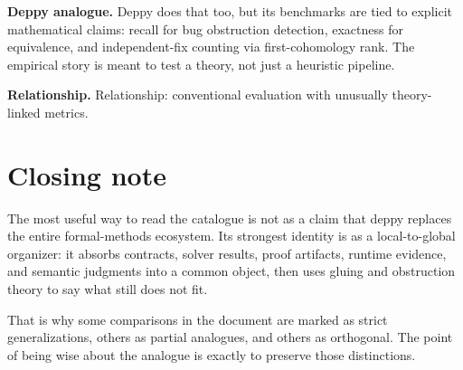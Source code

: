\documentclass[11pt,openany]{book}
\begin{document}
\textbf{Deppy analogue.} Deppy does that too, but its benchmarks are tied to explicit mathematical claims: recall for bug obstruction detection, exactness for equivalence, and independent-fix counting via first-cohomology rank. The empirical story is meant to test a theory, not just a heuristic pipeline.

\textbf{Relationship.} Relationship: conventional evaluation with unusually theory-linked metrics.

\chapter*{Closing note}
The most useful way to read the catalogue is not as a claim that deppy replaces the entire formal-methods ecosystem. Its strongest identity is as a local-to-global organizer: it absorbs contracts, solver results, proof artifacts, runtime evidence, and semantic judgments into a common object, then uses gluing and obstruction theory to say what still does not fit.

That is why some comparisons in the document are marked as strict generalizations, others as partial analogues, and others as orthogonal. The point of being wise about the analogue is exactly to preserve those distinctions.
\end{document}

